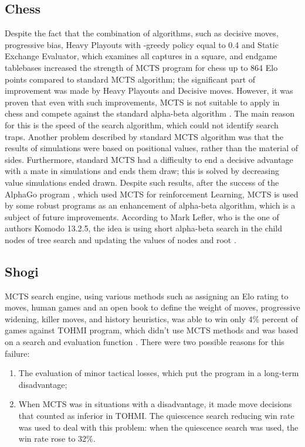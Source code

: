\documentclass[paper=8.27in:11.69in]{scrartcl}
\begin{document}
\subsection{Chess}
Despite the fact that the combination of algorithms, such as decisive moves, progressive bias, Heavy Playouts with \epsilon-greedy policy equal to 0.4 and Static Exchange Evaluator, which examines all captures in a square, and endgame tablebases increased the strength of MCTS program for chess up to 864 Elo points compared to standard MCTS algorithm; the significant part of improvement was made by Heavy Playouts and Decisive moves. However, it was proven that even with such improvements, MCTS is not suitable to apply in chess and compete against the standard alpha-beta algorithm \cite{Arenz}. The main reason for this is the speed of the search algorithm, which could not identify search traps. Another problem described by standard MCTS algorithm was that the results of simulations were based on positional values, rather than the material of sides. Furthermore, standard MCTS had a difficulty to end a decisive advantage with a mate in simulations and ends them draw; this is solved by decreasing value simulations ended drawn. Despite such results, after the success of the AlphaGo program \cite{Silver2017MasteringCA}, which used MCTS for reinforcement Learning, MCTS is used by some robust programs as an enhancement of alpha-beta algorithm, which is a subject of future improvements. According to Mark Lefler, who is the one of authors Komodo 13.2.5, the idea is using short alpha-beta search in the child nodes of tree search and updating the values of nodes and root \cite{SiteInterview}. \\
\subsection{Shogi}
MCTS search engine, using various methods such as assigning an Elo rating to moves, human games and an open book to define the weight of moves, progressive widening, killer moves, and history heuristics, was able to win only 4\% percent of games against TOHMI program, which didn’t use MCTS methods and was based on a search and evaluation function \cite{Sato2010ASP}. There were two possible reasons for this failure:\\

\begin{enumerate}[label=\arabic*)]

\item The evaluation of minor tactical losses, which put the program in a long-term disadvantage;
\item When MCTS was in situations with a disadvantage, it made move decisions that counted as inferior in TOHMI. The quiescence search reducing win rate was used to deal with this problem: when the quiescence search was used, the win rate rose to 32\%.

\end{enumerate}
\end{document}
